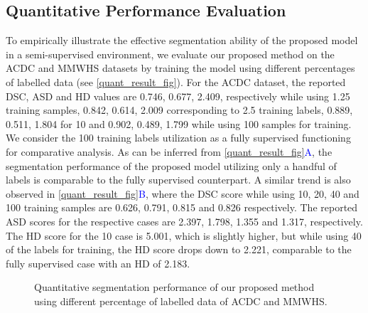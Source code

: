 \documentclass[runningheads]{llncs}
\begin{document}
\subsection{Quantitative Performance Evaluation}
To empirically illustrate the effective segmentation ability of the proposed model in a semi-supervised environment, we evaluate our proposed method on the ACDC and MMWHS datasets by training the model using different percentages of labelled data (see \autoref{quant_result_fig}). For the ACDC dataset, the reported DSC, ASD and HD values are 0.746, 0.677, 2.409, respectively while using 1.25 training samples, 0.842, 0.614, 2.009 corresponding to 2.5 training labels, 0.889, 0.511, 1.804 for 10 and 0.902, 0.489, 1.799 while using 100 samples for training. We consider the 100 training labels utilization as a fully supervised functioning for comparative analysis. As can be inferred from \autoref{quant_result_fig}\textcolor{blue}{A}, the segmentation performance of the proposed model utilizing only a handful of labels is comparable to the fully supervised counterpart. A similar trend is also observed in \autoref{quant_result_fig}\textcolor{blue}{B}, where the DSC score while using 10, 20, 40 and 100 training samples are 0.626, 0.791, 0.815 and 0.826 respectively. The reported ASD scores for the respective cases are 2.397, 1.798, 1.355 and 1.317, respectively. The HD score for the 10 case is 5.001, which is slightly higher, but while using 40 of the labels for training, the HD score drops down to 2.221, comparable to the fully supervised case with an HD of 2.183.

\begin{figure}[tbp]
 \centering
    \hspace{0cm}
    \caption{Quantitative segmentation performance of our proposed method using different percentage of labelled data of ACDC and MMWHS.}
    \label{quant_result_fig}
\end{figure}
\end{document}
